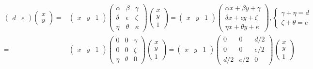\documentclass[
]{book}
\theoremstyle{definition}
\theoremstyle{definition}
\theoremstyle{definition}
\theoremstyle{definition}
\theoremstyle{remark}
\begin{document}
\[
\begin{aligned}
\begin{pmatrix}d & e\end{pmatrix}\begin{pmatrix}x\\
y
\end{pmatrix}= & \begin{pmatrix}x & y & 1\end{pmatrix}\begin{pmatrix}\alpha & \beta & \gamma\\
\delta & \epsilon & \zeta\\
\eta & \theta & \kappa
\end{pmatrix}\begin{pmatrix}x\\
y\\
1
\end{pmatrix}=\begin{pmatrix}x & y & 1\end{pmatrix}\begin{pmatrix}\alpha x+\beta y+\gamma\\
\delta x+\epsilon y+\zeta\\
\eta x+\theta y+\kappa
\end{pmatrix},\begin{cases}
\gamma+\eta=d\\
\zeta+\theta=e
\end{cases}\\
= & \begin{pmatrix}x & y & 1\end{pmatrix}\begin{pmatrix}0 & 0 & \gamma\\
0 & 0 & \zeta\\
\eta & \theta & 0
\end{pmatrix}\begin{pmatrix}x\\
y\\
1
\end{pmatrix}=\begin{pmatrix}x & y & 1\end{pmatrix}\begin{pmatrix}0 & 0 & d/2\\
0 & 0 & e/2\\
d/2 & e/2 & 0
\end{pmatrix}\begin{pmatrix}x\\
y\\
1
\end{pmatrix}
\end{aligned}
\]
\end{document}
